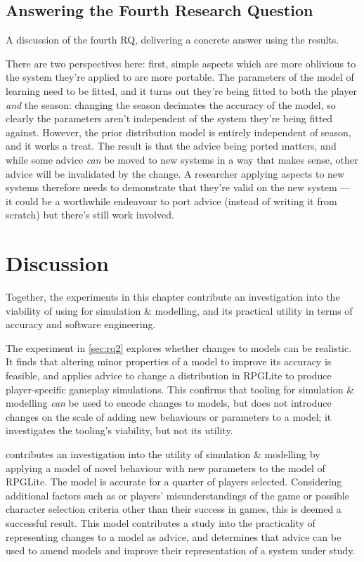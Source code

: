 \subsection{Answering the Fourth Research Question}

A discussion of the fourth RQ, delivering a concrete answer using the results.

There are two perspectives here: first, simple aspects which are more oblivious
to the system they're applied to are more portable. The parameters of the model
of learning need to be fitted, and it turns out they're being fitted to both the
player \emph{and} the season: changing the season decimates the accuracy of the
model, so clearly the parameters aren't independent of the system they're being
fitted against. However, the prior distribution model is entirely independent of
season, and it works a treat. The result is that the advice being ported
matters, and while some advice \emph{can} be moved to new systems in a way that
makes sense, other advice will be invalidated by the change. A researcher
applying aspects to new systems therefore needs to demonstrate that they're
valid on the new system --- it could be a worthwhile endeavour to port advice
(instead of writing it from scratch) but there's still work involved.





\section{Discussion}

Together, the experiments in this chapter contribute an investigation into the
viability of using \aop for simulation \& modelling, and its practical utility
in terms of accuracy and software engineering.

The experiment in \cref{sec:rq2} explores whether \aspectoriented{} changes to
models can be realistic. It finds that altering minor properties of a model to
improve its accuracy is feasible, and applies advice to change a distribution in
RPGLite to produce player-specific gameplay simulations. This confirms that
\aspectoriented{} tooling for simulation \& modelling \emph{can} be used to
encode changes to models, but does not introduce changes on the scale of adding
new behaviours or parameters to a model; it investigates the tooling's
viability, but not its utility.

 contributes an investigation into the utility of
\aspectoriented{} simulation \& modelling by applying a model of novel behaviour
with new parameters to the model of RPGLite. The model is accurate for a quarter
of players selected. Considering additional factors such as or players'
misunderstandings of the game or possible character selection criteria other
than their success in games, this is deemed a successful result. This model
contributes a study into the practicality of representing changes to a model as
advice, and determines that advice can be used to amend models and improve their
representation of a system under study.

